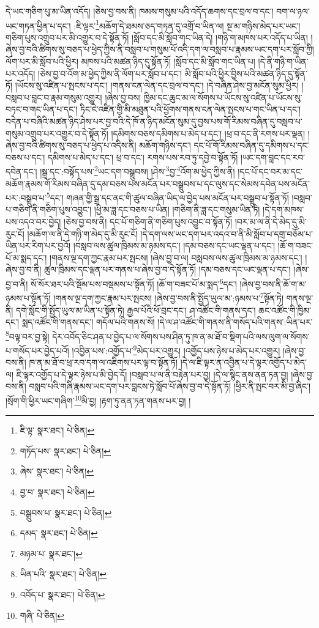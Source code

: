 དེ་ཡང་གཅིག་པུ་མ་ཡིན་འདོད། །ཅེས་བྱ་བས་ནི། ཁམས་གསུམ་པའི་འདོད་ཆགས་དང་བྲལ་བ་དང་། བག་ལ་ཉལ་ཡང་གཏན་ཕྱིན་པ་དང་། :ཇི་ལྟར་\footnote{ཇི་ལྟ་  སྣར་ཐང་།  པེ་ཅིན། }མཆོག་དེ་ཐམས་ཅད་གཏན་དུ་འགྲོ་བ་ཡིན་ལ། སྔ་མ་གཉིས་མེད་པར་ཡང་། གཅིག་པུས་འགྲུབ་པར་མི་འགྱུར་བ་དེ་སྟོན་ཏོ། །སློབ་དང་མི་སློབ་གང་ཡིན་དེ། །གཉི་ག་མཁས་པར་འདོད་པ་ཡིན། །ཞེས་བྱ་བའི་ཚིགས་སུ་བཅད་པ་ཕྱེད་ཀྱིས་ནི་བསླབ་པ་གསུམ་པོ་འདི་དག་ལ་བསླབ་པ་རྣམས་ཡང་དག་པར་སློབ་ཀྱི། ལོག་པར་མི་སློབ་པའི་ཕྱིར། མཁས་པའི་མཚན་ཉིད་དུ་སྟོན་ཏོ། །སློབ་དང་མི་སློབ་གང་ཡིན་པ། །དེ་ནི་གཉི་ག་ཡིན་པར་འདོད། །ཅེས་བྱ་བ་འོག་མ་ཕྱེད་ཀྱིས་ནི་ལོག་པར་སློབ་པ་དང་། མི་སློབ་པའི་ཕྱིར་བྱིས་པའི་མཚན་ཉིད་དུ་སྟོན་ཏོ། །ཡོངས་སུ་འཛིན་པ་སྤངས་པ་དང་། །གནས་ངན་ལེན་དང་བྲལ་བ་དང་། །དེ་བཞིན་ཤེས་བྱ་མངོན་སུམ་ཕྱིར། །བསླབ་པ་བླང་བ་རྣམ་གསུམ་འགྱུར། །ཞེས་བྱ་བས། ཁྱིམ་དང་ཆུང་མ་ལ་སོགས་པ་ཡོངས་སུ་འཛིན་པ་ཡོངས་སུ་བཏང་བ་གང་ཡིན་པ་དང་། ཏིང་ངེ་འཛིན་གྱི་མི་མཐུན་པའི་ཕྱོགས་གནས་ངན་ལེན་སྤངས་པ་གང་ཡིན་པ་དང་། བདེན་པ་བཞིའི་མཚན་ཉིད་ཤེས་པར་བྱ་བའི་དེ་ཁོ་ན་ཉིད་མངོན་སུམ་དུ་བྱས་པས་གོ་རིམས་བཞིན་དུ་བསླབ་པ་གསུམ་འགྲུབ་པར་འགྱུར་བ་དེ་སྟོན་ཏོ། །དམིགས་བཅས་དམིགས་པ་མེད་པ་དང་། །ཕྲ་བ་དང་ནི་རགས་པར་ལྡན། །ཞེས་བྱ་བའི་ཚིགས་སུ་བཅད་པ་ཕྱེད་པ་འདིས་ནི། མཆོག་གཉིས་དང་། དང་པོ་གོ་རིམས་བཞིན་དུ་དམིགས་པ་དང་བཅས་པ་དང་། དམིགས་པ་མེད་པ་དང་། ཕྲ་བ་དང་། རགས་པས་རབ་ཏུ་དབྱེ་བ་སྟོན་ཏོ། །ཡང་དག་བླང་དང་རབ་དབེན་དང་། །སྒྲ་དང་:བསྟོད་པས་\footnote{གཏོད་པས་  སྣར་ཐང་།  པེ་ཅིན། }ཡང་དག་བསྒྲུབས། །ཤེས་\footnote{ཞེས་  སྣར་ཐང་།  པེ་ཅིན། }བྱ་\footnote{བྱ་བ་  སྣར་ཐང་།  པེ་ཅིན། }འོག་མ་ཕྱེད་ཀྱིས་ནི། །དང་པོ་དང་བར་མ་དང་མཆོག་རྣམས་གོ་རིམས་བཞིན་དུ་དམ་བཅས་པས་མངོན་པར་བསྒྲུབས་པ་དང་ལུས་དང་སེམས་དབེན་པས་མངོན་པར་:བསྒྲུབ་པ་\footnote{བསྒྲུབས་པ་  སྣར་ཐང་།  པེ་ཅིན། }དང་། གཞན་གྱི་སྒྲ་དང་ནང་གི་ཚུལ་བཞིན་ཡིད་ལ་བྱེད་པས་མངོན་པར་བསྒྲུབ་པ་སྟོན་ཏོ། །བསླབ་པ་གཅིག་ནི་གཅིག་པུས་འབྱུང་། །ཕྱི་མ་ཟླ་དང་བཅས་པ་ཡིན། །གཅིག་ནི་ཟླ་དང་གསུམ་ཡིན་ཏེ། །དེ་དག་མཁས་པས་འདའ་བར་བྱེད། །ཅེས་བྱ་བས་ནི། དང་པོ་གཅིག་ནི་གཅིག་པུས་འབྱུང་བ་སྟོན་ཏོ། །བར་མ་ལ་ནི་དེ་མེད་དུ་མི་རུང་ངོ། །མཆོག་ལ་ནི་དེ་གཉི་ག་མེད་དུ་མི་རུང་ངོ། །དེ་དག་ལས་ཡང་དག་པར་འདའ་བ་ནི་མི་སློབ་པ་དགྲ་བཅོམ་པ་ཡིན་པར་རིག་པར་བྱའོ། །བསླབ་ལས་ཚུལ་ཁྲིམས་མ་ཉམས་དང་། །དམ་བཅས་དང་ཡང་ལྡན་པ་དང་། །ཆོ་ག་བཟང་པོ་མ་སྨད་དང་། །གནས་ལྔ་དག་ཀྱང་རྣམ་པར་སྤངས། །ཞེས་བྱ་བ་ལ། བསླབས་ལས་ཚུལ་ཁྲིམས་མ་ཉམས་དང་། །ཞེས་བྱ་བ་ནི། ཚུལ་ཁྲིམས་དང་ལྡན་པར་གནས་པ་ཞེས་བྱ་བ་དེ་སྟོན་ཏོ། །དམ་བཅས་དང་ཡང་ལྡན་པ་དང་། །ཞེས་བྱ་བ་ནི། སོ་སོར་ཐར་པའི་སྡོམ་པས་བསྡམས་པ་སྟོན་ཏོ། །ཆོ་ག་བཟང་པོ་མ་སྨད་\footnote{དམད་  སྣར་ཐང་།  པེ་ཅིན། }དང་། །ཞེས་བྱ་བས་ནི་ཆོ་ག་མ་ཉམས་པ་སྟོན་ཏོ། །གནས་ལྔ་དག་ཀྱང་རྣམ་པར་སྤངས། །ཞེས་བྱ་བས་ནི་སྤྱོད་ཡུལ་མ་:ཉམས་པ་\footnote{མཉམ་པ་  སྣར་ཐང་། }སྟོན་ཏེ། གནས་ལྔ་ནི། དགེ་སློང་གི་སྤྱོད་ཡུལ་མ་ཡིན་པ་སྟོན་ཏེ། རྒྱལ་པོའི་ཕོ་བྲང་དང་། ཤ་འཚོང་གི་གནས་དང་། ཆང་འཚོང་གི་ཁྱིམ་དང་། སྨད་འཚོང་གི་གནས་དང་། གདོལ་པའི་གནས་སོ། །དེ་ལ་ཤ་འཚོང་གི་གནས་ནི་གསོད་པའི་གནས་:ཡིན་པར་\footnote{ཡིན་པའི་  སྣར་ཐང་།  པེ་ཅིན། }བལྟ་བར་བྱ་སྟེ། དེར་འབོད་ཅིང་ཤན་པ་བྱེད་པ་ལ་སོགས་པས་ཤིན་ཏུ་ཁ་ན་མ་ཐོ་བ་སྡིག་པའི་ལས་ལུག་ལ་སོགས་པ་གསོད་པར་བྱེད་པའོ། །འབྱིན་པས་:འགྱོད་པ་\footnote{འབོད་པ་  སྣར་ཐང་།  པེ་ཅིན། }མེད་པར་འགྱུར། །འགྱོད་པས་ཉེས་པ་མེད་པར་འགྱུར། །ཞེས་བྱ་བས་ནི། ཁ་ན་མ་ཐོ་བ་ཕྲ་རབ་དག་ལ་འཇིགས་པར་ལྟ་བ་སྟོན་ཏོ། །དེ་ལ་ཇི་ལྟར་ན་འབྱིན་པ་དེ་ལྟར་འགྱོད་པ་མེད་ལ། ཇི་ལྟར་འགྱོད་པ་དེ་ལྟར་ཉེས་པ་མི་བྱེད་དོ། །བསླབ་པ་ལ་ནི་བརྟེན་པར་བྱ། །དེ་ལ་སྙིང་ནས་ནན་ཏན་བྱ། །ཞེས་བྱ་བས་ནི། བསླབ་པའི་གཞི་རྣམས་ཡང་དག་པར་བླངས་ཏེ་སློབ་པོ་ཞེས་བྱ་བ་དེ་སྟོན་ཏོ། །ཕྱིར་ནི་སྤང་བར་མི་བྱ་ཞིང་། །སྲོག་གི་ཕྱིར་ཡང་གཞིག་\footnote{གཞི་  པེ་ཅིན། }མི་བྱ། །རྟག་ཏུ་ནན་ཏན་གནས་པར་བྱ། །
